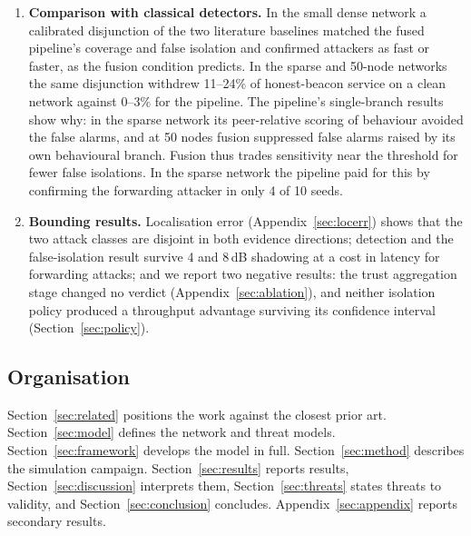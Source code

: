\begin{enumerate}
\item \textbf{Comparison with classical detectors.} In the
      small dense network a calibrated disjunction of the two literature
      baselines matched the fused pipeline's coverage and false isolation
      and confirmed attackers as fast or faster, as the fusion condition
      predicts. In the sparse and 50-node networks the same disjunction
      withdrew 11--24\% of honest-beacon service on a clean network against
      0--3\% for the pipeline. The pipeline's single-branch results show
      why: in the sparse network its peer-relative scoring of behaviour
      avoided the false alarms, and at 50 nodes fusion suppressed false
      alarms raised by its own behavioural branch. Fusion thus trades
      sensitivity near the threshold for fewer false isolations. In the
      sparse network the pipeline paid for this by confirming the
      forwarding attacker in only 4 of 10 seeds.

\item \textbf{Bounding results.} Localisation error
      (Appendix~\ref{sec:locerr}) shows that the two
      attack classes are disjoint in both evidence directions; detection and
      the false-isolation result survive 4 and 8\,dB shadowing at a cost in
      latency for forwarding attacks; and we report two negative results:
      the trust aggregation stage changed no verdict
      (Appendix~\ref{sec:ablation}), and neither isolation policy produced a
      throughput advantage surviving its confidence interval
      (Section~\ref{sec:policy}).
\end{enumerate}

\subsection{Organisation}

Section~\ref{sec:related} positions the work against the closest prior art.
Section~\ref{sec:model} defines the network and threat models.
Section~\ref{sec:framework} develops the model in full.
Section~\ref{sec:method} describes the simulation campaign.
Section~\ref{sec:results} reports results, Section~\ref{sec:discussion}
interprets them, Section~\ref{sec:threats} states threats to validity, and
Section~\ref{sec:conclusion} concludes. Appendix~\ref{sec:appendix}
reports secondary results.
